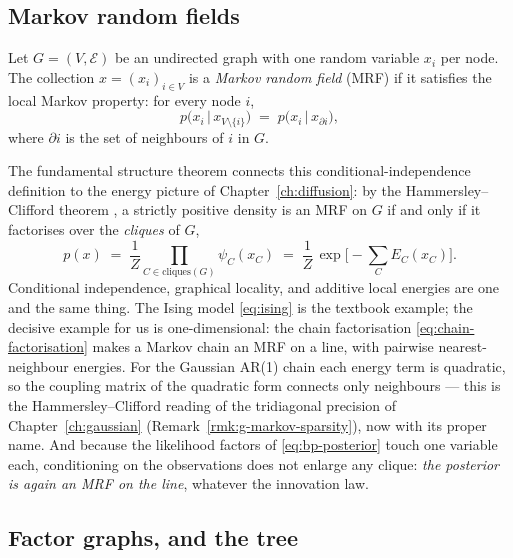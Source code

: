 \subsection{Markov random fields}\label{sec:mrf}

\begin{definition}
Let $G = (V, \mathcal{E})$ be an undirected graph with one random variable
$x_i$ per node. The collection $x = (x_i)_{i \in V}$ is a \emph{Markov
random field} (MRF) if it satisfies the local Markov property: for every
node $i$,
\begin{equation}
  p\big(x_i \,\big|\, x_{V \setminus \{i\}}\big)
  \;=\; p\big(x_i \,\big|\, x_{\partial i}\big),
  \label{eq:local-markov}
\end{equation}
where $\partial i$ is the set of neighbours of $i$ in $G$.
\end{definition}

The fundamental structure theorem connects this conditional-independence
definition to the energy picture of Chapter~\ref{ch:diffusion}: by the
Hammersley--Clifford theorem \citep[proved in][]{besag1974spatial}, a
strictly positive density is an MRF on $G$ if and only if it factorises
over the \emph{cliques} of $G$,
\begin{equation}
  p(x) \;=\; \frac{1}{Z} \prod_{C \in \mathrm{cliques}(G)} \psi_C(x_C)
  \;=\; \frac{1}{Z}\, \exp\Big[ -\sum_C E_C(x_C) \Big] .
  \label{eq:hammersley-clifford}
\end{equation}
Conditional independence, graphical locality, and additive local energies
are one and the same thing. The Ising model \eqref{eq:ising} is the
textbook example; the decisive example for us is one-dimensional: the
chain factorisation \eqref{eq:chain-factorisation} makes a Markov chain an
MRF on a line, with pairwise nearest-neighbour energies. For the Gaussian
AR(1) chain each energy term is quadratic, so the coupling matrix of the
quadratic form connects only neighbours --- this is the
Hammersley--Clifford reading of the tridiagonal precision of
Chapter~\ref{ch:gaussian} (Remark~\ref{rmk:g-markov-sparsity}), now with
its proper name. And because the likelihood factors of
\eqref{eq:bp-posterior} touch one variable each, conditioning on the
observations does not enlarge any clique: \emph{the posterior is again an
MRF on the line}, whatever the innovation law.

\subsection{Factor graphs, and the tree}\label{sec:factor-graphs}

